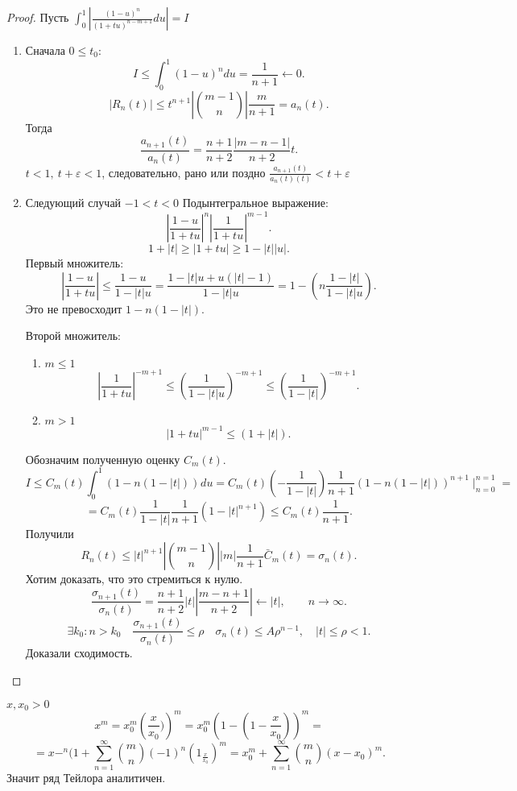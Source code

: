 \documentclass[11pt]{book}
\renewcommand{\le}{\leqslant}
\renewcommand{\ge}{\geqslant}
\theoremstyle{definition}
\theoremstyle{plain}
\theoremstyle{plain}
\theoremstyle{definition}
\theoremstyle{remark}
\begin{document}
\begin{proof}
    Пусть $ \int_0 ^{1} \left|\frac{(1-u)^{n}}{(1+tu)^{n-m+1}} du \right| = I$
    \begin{enumerate}
	\item Сначала $ 0 \le t_0$:
	    \[
		I \le \int_0^{1} (1-u)^{n} du = \frac{1}{n+1} \longleftarrow 0
	    .\]
	    \[
		|R_n(t)| \le  t ^{n+1} \left| {m-1 \choose n} \right| \frac{m}{n+1} =a_n(t)
	    .\]
	    Тогда \[
		\frac{a_{n+1}(t)}{a_n(t)} = \frac{n+1}{n+2} \frac{|m-n-1|}{n+2} t
	    .\]
	    $ t <1, ~ t+ \varepsilon  <1 $, следовательно, рано или поздно  $ \frac{a_{n+1}(t)}{a_n(t) (t)} < t+ \varepsilon $

	\item Следующий случай $ -1 < t< 0$
	    Подынтегральное выражение:
	    \[
		\left| \frac{1-u}{1 + tu} \right| ^{n } \left| \frac{1}{1+tu} \right|  ^{m-1}
	    .\]
	    \[
		1 + |t| \ge |1 + tu| \ge  1 - |t| |u|
	    .\]
	    Первый множитель:
	    \[
		\left| \frac{1-u}{1+tu} \right| \le  \frac{1-u}{1 - |t| u} = \frac{1-|t|u + u(|t| -1)}{1 - |t| u} = 1 - \left(n\frac{1-|t|}{1-|t|u} \right)
	    .\]
	    Это не превосходит $ 1 - n(1 - |t|)$.

	    Второй множитель:
	    \begin{enumerate}
		\item $ m \le  1$
		    \[
			\left| \frac{1}{1+tu} \right|^{-m+1} \le  \left(\frac{1}{1-|t| u}\right)^{-m+1} \le \left(\frac{1}{1-|t|} \right) ^{-m+1}
		    .\]
		\item $ m > 1$
		    \[
			|1 + tu|^{m-1} \le  (1  + |t|)
		    .\]
	    \end{enumerate}
	    Обозначим полученную оценку $ C_m(t)$.
	    \[
		I \le C_m(t) \int_0^{1} (1-n(1-|t|))^{} du = C_m(t) \left( - \frac{1}{1 - |t|} \right) \frac{1}{n+1} (1-n(1-|t|))^{n+1}\mid _{n=0}^{n=1}
	    =\]
	    \[
		= C_m(t) \frac{1}{1-|t|}\frac{1}{n+1} (1- |t|^{n+1}) \le C_m(t) \frac{1}{n+1}
	    .\]
	    Получили \[
		R_n(t) \le |t|^{n+1} \left|{ m-1\choose n}\right| |m|\frac{1}{n+1} \bar{C}_m(t) = \sigma_n(t)
	    .\]
	    Хотим доказать, что это стремиться к нулю.
	    \[
		\frac{\sigma_{n+1}(t)}{\sigma_{n}(t)} = \frac{n+1}{n+2} |t| \left| \frac{m-n+1}{n+2} \right|  \longleftarrow |t|, \qquad n \to \infty
	    .\]
	    \[
		\exists k_0 : n > k_0 \quad \frac{\sigma_{n+1}(t)}{\sigma_{n}(t)} \le \rho \quad \sigma_n(t) \le A \rho^{n-1}, \quad |t| \le \rho < 1
	    .\]
	    Доказали сходимость.
    \end{enumerate}
\end{proof}
$ x, x_0 > 0$
\[
    x ^{m} = x_0^{m} \left(\frac{x}{x_0})\right)^{m} = x_0 ^{m} (1 - (1 - \frac{x}{x_0}))^{m} =
\]
\[
    = x-^{n} (1 + \sum_{n=1}^{\infty} {m \choose n} (-1) ^{n} \left( 1 _ \frac{x}{x_0} \right) ^{m} = x_0^{m}+ \sum_{n=1}^{\infty} {m \choose n} (x- x_0)^{m}
.\]
Значит ряд Тейлора аналитичен.
\end{document}
